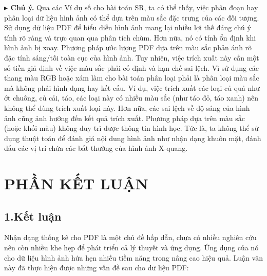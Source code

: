 \documentclass[a4paper,oneside]{book} %
\theoremstyle{plain}
\theoremstyle{plain}
\theoremstyle{nonumberplain}
\begin{document}
\textbf{$\blacktriangleright$ Chú ý.}
Qua các Ví dụ số cho bài toán SR, ta có thể thấy, việc phân đoạn hay phân loại dữ liệu hình ảnh có thể dựa trên màu sắc đặc trưng của các đối tượng. Sử dụng dữ liệu PDF để biểu diễn hình ảnh mang lại nhiều lợi thế đáng chú ý tính rõ ràng và trực quan qua phân tích chùm. Hơn nữa, nó có tính ổn định khi hình ảnh bị xoay. Phương pháp ước lượng PDF dựa trên màu sắc phản ánh rõ đặc tính sáng/tối toàn cục của hình ảnh.
Tuy nhiên, việc trích xuất này cần một số tiền giả định về việc màu sắc phải cố định và hạn chế sai lệch. Vì sử dụng các thang màu RGB hoặc xám làm cho bài toán phân loại phải là phân loại màu sắc mà không phải hình dạng hay kết cấu. Ví dụ, việc trích xuất các loại củ quả như ớt chuông, củ cải, táo, các loại này có nhiều màu sắc (như táo đỏ, táo xanh) nên không thể dùng trích xuất loại này. Hơn nữa, các sai lệch về độ sáng của hình ảnh cũng ảnh hưởng đến kết quả trích xuất.
Phương pháp dựa trên màu sắc (hoặc khối màu) không duy trì được thông tin hình học. Tức là, ta không thể sử dụng thuật toán để đánh giá nội dung hình ảnh như nhận dạng khuôn mặt, đánh dấu các vị trí chứa các bất thường của hình ảnh X-quang. 



%
%


\chapter*{PHẦN KẾT LUẬN}\label{chapter_ketluan}

\section*{1.\quad Kết luận}

Nhận dạng thống kê cho PDF là một chủ đề hấp dẫn, chưa có nhiều nghiên cứu nên còn nhiều khe hẹp để phát triển cả lý thuyết và ứng dụng. Ứng dụng của nó cho dữ liệu hình ảnh hứa hẹn nhiều tiềm năng trong nâng cao hiệu quả. Luận văn này đã thực hiện được những vấn đề sau cho dữ liệu PDF:
\end{document}
